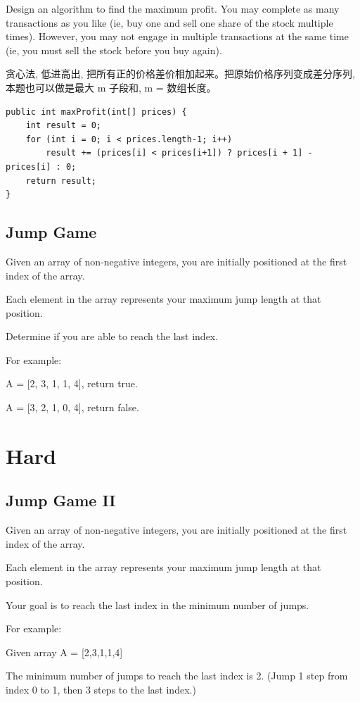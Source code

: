 \documentclass[12pt]{book}
\begin{document}
Design an algorithm to find the maximum profit. You may complete as many transactions as you like (ie, buy one and sell one share of the stock multiple times). However, you may not engage in multiple transactions at the same time (ie, you must sell the stock before you buy again).

贪心法, 低进高出, 把所有正的价格差价相加起来。把原始价格序列变成差分序列, 本题也可以做是最大 m 子段和, m = 数组长度。

\lstset{language=java,label= ,caption= ,numbers=none}
\begin{lstlisting}
public int maxProfit(int[] prices) {
    int result = 0;
    for (int i = 0; i < prices.length-1; i++) 
        result += (prices[i] < prices[i+1]) ? prices[i + 1] - prices[i] : 0;
    return result;
}
\end{lstlisting}

\subsection{Jump Game}
\label{sec-13-1-4}
Given an array of non-negative integers, you are initially positioned at the first index of the array.

Each element in the array represents your maximum jump length at that position.

Determine if you are able to reach the last index.

For example:

A = [2, 3, 1, 1, 4], return true.

A = [3, 2, 1, 0, 4], return false.

\section{Hard}
\label{sec-13-2}
\subsection{Jump Game II}
\label{sec-13-2-1}
Given an array of non-negative integers, you are initially positioned at the first index of the array.

Each element in the array represents your maximum jump length at that position.

Your goal is to reach the last index in the minimum number of jumps.

For example:

Given array A = [2,3,1,1,4]

The minimum number of jumps to reach the last index is 2. (Jump 1 step from index 0 to 1, then 3 steps to the last index.)
\end{document}
